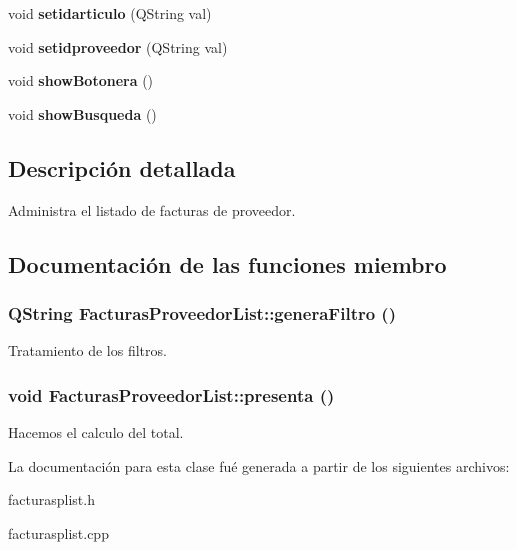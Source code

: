 \begin{CompactItemize}
\item 
void {\bf setidarticulo} (QString val)\label{classFacturasProveedorList_a14}

\item 
void {\bf setidproveedor} (QString val)\label{classFacturasProveedorList_a15}

\item 
void {\bf show\-Botonera} ()\label{classFacturasProveedorList_a16}

\item 
void {\bf show\-Busqueda} ()\label{classFacturasProveedorList_a17}

\end{CompactItemize}


\subsection{Descripci\'{o}n detallada}
Administra el listado de facturas de proveedor. 



\subsection{Documentaci\'{o}n de las funciones miembro}
\subsubsection{\setlength{\rightskip}{0pt plus 5cm}QString Facturas\-Proveedor\-List::genera\-Filtro ()}\label{classFacturasProveedorList_a4}


Tratamiento de los filtros. 
\subsubsection{\setlength{\rightskip}{0pt plus 5cm}void Facturas\-Proveedor\-List::presenta ()}\label{classFacturasProveedorList_a12}


Hacemos el calculo del total. 

La documentaci\'{o}n para esta clase fu\'{e} generada a partir de los siguientes archivos:\begin{CompactItemize}
\item 
facturasplist.h\item 
facturasplist.cpp\end{CompactItemize}
